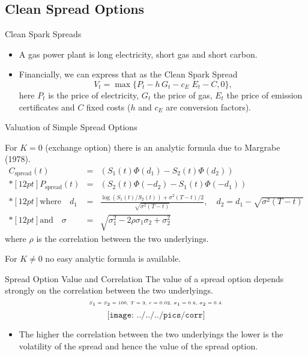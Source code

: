 \subsection{Clean Spread Options}

{Clean Spark Spreads}
\begin{itemize}
\item<1-> A gas power plant is  long electricity, short gas and short carbon.
\item<2-> Financially, we can express that as the Clean Spark Spread
\begin{equation}
V_t = \max\{P_t - h\,G_t - c_E\;E_t - C, 0\},
\label{spark_spread_value}
\end{equation}
here  $P_t$ is the price of electricity, $G_t$ the price of gas, $E_t$ the price of emission certificates  and $C$ fixed costs ($h$ and $c_E$ are conversion factors).
\end{itemize}


{Valuation of Simple Spread Options}

For $K=0$ (exchange option) there is an analytic formula due to
Margrabe (1978).
$$\begin{array}{lll}
 C_{\mbox{spread}}(t) & = & (S_1(t)\Phi(d_1)-S_2(t)\Phi(d_2))
 \\*[12pt]
 P_{\mbox{spread}}(t) & = & (S_2(t)\Phi(-d_2)-S_1(t)\Phi(-d_1))
 \\*[12pt]
 \mbox{where}\quad d_1 & = & \frac{\log(S_1(t)/S_2(t))+\sigma^{2}(T-t)/2}{\sqrt{\sigma^{2}(T-t)}},\quad d_2=d_1-\sqrt{\sigma^{2}(T-t)}
 \\*[12pt]
 \mbox{and}\quad \sigma & = & \sqrt{\sigma_1^2-2\rho\sigma_1\sigma_2+\sigma_2^2}
\end{array}$$
where $\rho$ is the correlation between the two underlyings.

For $K\neq 0$ no easy analytic formula is available.

{Spread Option Value and Correlation}
The value of a spread option depends strongly on the correlation between the two underlyings.
$$\tiny\text{$S_1=S_2=100$, $T=3$, $r=0.02$, $\sigma_1=0.6$, $\sigma_2=0.4$.}$$
\vspace{-0.76cm}
$$\texttt{[image: ../../../pics/corr]}$$
\begin{itemize}
\vspace{-1cm}
\item The higher the correlation between the two underlyings the lower is the volatility of the spread and hence the value of the spread option.
\end{itemize}

